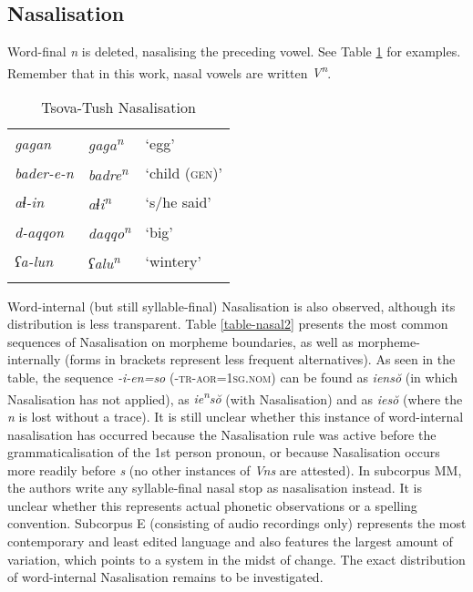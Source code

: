 \subsection{Nasalisation}

Word-final \textit{n} is deleted, nasalising the preceding vowel. See Table \ref{table-nasal} for examples. Remember that in this work, nasal vowels are written \textit{V\textsuperscript{n}}.


\begin{table}
	\begin{tabular}{lll}
		\lsptoprule
		\textit{gagan} & \textit{gaga\textsuperscript{n}} & `egg' \\
		\textit{bader-e-n} & \textit{badre\textsuperscript{n}} & `child (\textsc{gen})' \\
		\textit{aɬ-in} & \textit{aɬi\textsuperscript{n}} & `s/he said' \\
		\textit{d-aqqon} & \textit{daqqo\textsuperscript{n}} & `big' \\
		\textit{ʕa-lun} & \textit{ʕalu\textsuperscript{n}} & `wintery' \\
		\lspbottomrule
	\end{tabular}
	\caption{Tsova-Tush Nasalisation}
	\label{table-nasal}
\end{table}

Word-internal (but still syllable-final) Nasalisation is also observed, although its distribution is less transparent. Table \ref{table-nasal2} presents the most common sequences of Nasalisation on morpheme boundaries, as well as morpheme-internally (forms in brackets represent less frequent alternatives). 
As seen in the table, the sequence \textit{-i-en=so} (\textsc{-tr-aor=1sg.nom}) can be found as \textit{iens\u{o}} (in which Nasalisation has not applied), as \textit{ie\textsuperscript{n}s\u{o}} (with Nasalisation) and as \textit{ies\u{o}} (where the \textit{n} is lost without a trace). 
It is still unclear whether this instance of word-internal nasalisation has occurred because the Nasalisation rule was active before the grammaticalisation of the 1st person pronoun, or because Nasalisation occurs more readily before \textit{s} (no other instances of \textit{Vns} are attested). In subcorpus MM, the authors write any syllable-final nasal stop as nasalisation instead. It is unclear whether this represents actual phonetic observations or a spelling convention. Subcorpus E (consisting of audio recordings only) represents the most contemporary and least edited language and also features the largest amount of variation, which points to a system in the midst of change. The exact distribution of word-internal Nasalisation remains to be investigated.

